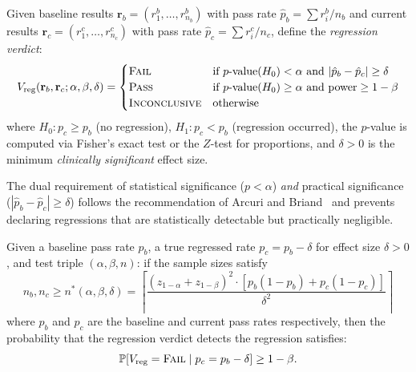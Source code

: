 \begin{definition}
\label{def:regression}
Given baseline results $\mathbf{r}_b = (r_1^b, \ldots, r_{n_b}^b)$ with
pass rate $\hat{p}_b = \sum r_i^b / n_b$ and current results
$\mathbf{r}_c = (r_1^c, \ldots, r_{n_c}^c)$ with pass rate
$\hat{p}_c = \sum r_i^c / n_c$, define the \emph{regression verdict}:
\begin{equation}
\label{eq:regression-verdict}
  V_{\text{reg}}(\mathbf{r}_b, \mathbf{r}_c; \alpha, \beta, \delta) =
  \begin{cases}
    \textsc{Fail} & \text{if } p\text{-value}(H_0) < \alpha \text{ and }
      |\hat{p}_b - \hat{p}_c| \geq \delta \\
    \textsc{Pass} & \text{if } p\text{-value}(H_0) \geq \alpha \text{ and }
      \text{power} \geq 1-\beta \\
    \textsc{Inconclusive} & \text{otherwise}
  \end{cases}
\end{equation}
where $H_0: p_c \geq p_b$ (no regression), $H_1: p_c < p_b$
(regression occurred), the $p$-value is computed via Fisher's exact test
or the $Z$-test for proportions, and $\delta > 0$ is the minimum
\emph{clinically significant} effect size.
\end{definition}

The dual requirement of statistical significance ($p < \alpha$) \emph{and}
practical significance ($|\hat{p}_b - \hat{p}_c| \geq \delta$) follows
the recommendation of Arcuri and Briand~\citep{arcuri2011practical} and
prevents declaring regressions that are statistically detectable but
practically negligible.

\begin{theorem}
\label{thm:power}
Given a baseline pass rate $p_b$, a true regressed rate
$p_c = p_b - \delta$ for effect size $\delta > 0$, and test triple
$(\alpha, \beta, n)$: if the sample sizes satisfy
\begin{equation}
\label{eq:required-n}
  n_b, n_c \geq n^*(\alpha, \beta, \delta) =
  \left\lceil
    \frac{(z_{1-\alpha} + z_{1-\beta})^2 \cdot
          [p_b(1-p_b) + p_c(1-p_c)]}
         {\delta^2}
  \right\rceil
\end{equation}
where $p_b$ and $p_c$ are the baseline and current pass rates respectively, then the probability that the
regression verdict detects the regression satisfies:
\[
  \mathbb{P}[V_{\text{reg}} = \textsc{Fail} \mid p_c = p_b - \delta] \geq 1 - \beta.
\]
\end{theorem}

